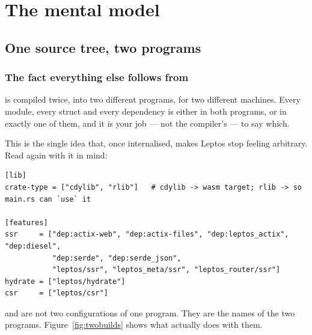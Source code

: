 \part{The mental model}

\chapter{One source tree, two programs}
\label{ch:twobuilds}

\section{The fact everything else follows from}

\begin{keyidea}
 is compiled twice, into two different programs, for two different machines. Every
module, every struct and every dependency is either in both programs, or in exactly one of them,
and it is your job --- not the compiler's --- to say which.
\end{keyidea}

This is the single idea that, once internalised, makes Leptos stop feeling arbitrary. Read
 again with it in mind:

\begin{lstlisting}[style=toml,caption={The features that select which program is being built.}]
[lib]
crate-type = ["cdylib", "rlib"]   # cdylib -> wasm target; rlib -> so main.rs can `use` it

[features]
ssr     = ["dep:actix-web", "dep:actix-files", "dep:leptos_actix", "dep:diesel",
           "dep:serde", "dep:serde_json",
           "leptos/ssr", "leptos_meta/ssr", "leptos_router/ssr"]
hydrate = ["leptos/hydrate"]
csr     = ["leptos/csr"]
\end{lstlisting}

 and  are not two configurations of one program. They are the names of the
two programs. Figure~\ref{fig:twobuilds} shows what  actually does with
them.


